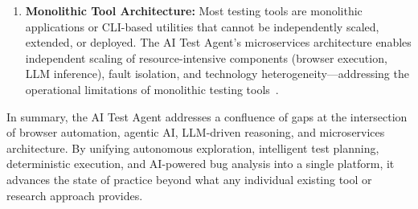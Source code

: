 \begin{enumerate}[nosep]
  \item \textbf{Monolithic Tool Architecture:} Most testing tools are
        monolithic applications or CLI-based utilities that cannot be
        independently scaled, extended, or deployed. The AI Test Agent's
        microservices architecture enables independent scaling of
        resource-intensive components (browser execution, LLM inference),
        fault isolation, and technology heterogeneity---addressing
        the operational limitations of monolithic testing
        tools~\cite{fowler2014microservices, newman2021microservices}.
\end{enumerate}

\noindent
In summary, the AI Test Agent addresses a confluence of gaps at the
intersection of browser automation, agentic AI, LLM-driven reasoning,
and microservices architecture. By unifying autonomous exploration,
intelligent test planning, deterministic execution, and AI-powered bug
analysis into a single platform, it advances the state of practice
beyond what any individual existing tool or research approach provides.
